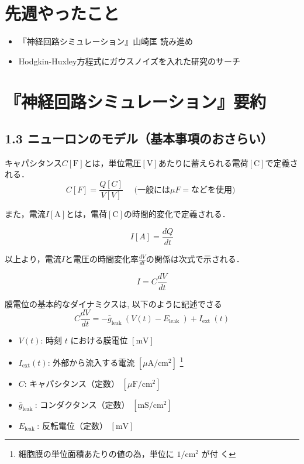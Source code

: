 \documentclass[dvipdfmx, A4j, twocolumn, 10.5pt]{jsarticle}
\begin{document}


\section{先週やったこと}
\begin{itemize}
 \item 『神経回路シミュレーション』山崎匡 読み進め
 \item Hodgkin-Huxley方程式にガウスノイズを入れた研究のサーチ

\end{itemize}
\section{『神経回路シミュレーション』要約}

\subsection*{1.3 ニューロンのモデル（基本事項のおさらい）}


キャパシタンス$C[\mathrm{F}]$とは，単位電圧$[\mathrm{V}]$あたりに蓄えられる電荷$[\mathrm{C}]$で定義される．
$$
C[F]=\frac{Q[C]}{V[V]} \quad \text { (一般には} \mu F=\text {などを使用) }
$$

また，電流$I[\mathrm{A}]$とは，電荷$[\mathrm{C}]$の時間的変化で定義される．

$$
I[A]=\frac{dQ}{dt}
$$

以上より，電流$I$と電圧の時間変化率$\frac{dV}{dt}$の関係は次式で示される．

$$ 
I=C \frac{dV}{dt}
$$

膜電位の基本的なダイナミクスは, 以下のように記述でさる
$$
C \frac{d V}{d t}=-\bar{g}_{\text {leak }}\left(V(t)-E_{\text {leak }}\right)+I_{\text {ext }}(t)
$$


\begin{itemize}
    \item $V(t)$: 時刻 $t$ における膜電位 $[\mathrm{mV}]$
    \item $I_{\mathrm{ext}}(t)$: 外部から流入する電流 $\left[\mu \mathrm{A} / \mathrm{cm}^2\right]$ \footnote{細胞膜の単位面積あたりの値の為，単位に $1 / \mathrm{cm}^2$ が付 く}
    \item $C$: キャパシタンス（定数） $\left[\mu \mathrm{F} / \mathrm{cm}^2\right]$
    \item $\bar{g}_{\text {leak }}$: コンダクタンス（定数） $\left[\mathrm{mS} / \mathrm{cm}^2\right]$
    \item $E_{\text {leak }}$: 反転電位（定数） $[\mathrm{mV}]$
\end{itemize}
\end{document}
